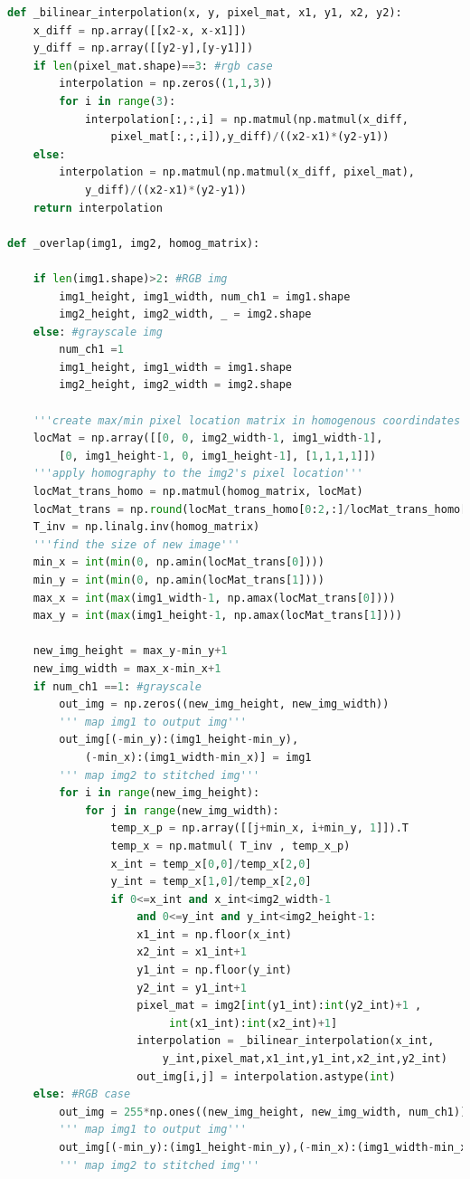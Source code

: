 \documentclass[12pt]{article}
\begin{document}
\vspace{3em}
\begin{lstlisting}[language=python]
def _bilinear_interpolation(x, y, pixel_mat, x1, y1, x2, y2):
	x_diff = np.array([[x2-x, x-x1]])
	y_diff = np.array([[y2-y],[y-y1]])
	if len(pixel_mat.shape)==3: #rgb case
		interpolation = np.zeros((1,1,3))
		for i in range(3):
			interpolation[:,:,i] = np.matmul(np.matmul(x_diff, 
				pixel_mat[:,:,i]),y_diff)/((x2-x1)*(y2-y1))
	else:
		interpolation = np.matmul(np.matmul(x_diff, pixel_mat),
			y_diff)/((x2-x1)*(y2-y1))
	return interpolation

def _overlap(img1, img2, homog_matrix):
	                  
	if len(img1.shape)>2: #RGB img
		img1_height, img1_width, num_ch1 = img1.shape
		img2_height, img2_width, _ = img2.shape
	else: #grayscale img
		num_ch1 =1
		img1_height, img1_width = img1.shape
		img2_height, img2_width = img2.shape
	
	'''create max/min pixel location matrix in homogenous coordindates'''
	locMat = np.array([[0, 0, img2_width-1, img1_width-1], 
		[0, img1_height-1, 0, img1_height-1], [1,1,1,1]])
	'''apply homography to the img2's pixel location'''
	locMat_trans_homo = np.matmul(homog_matrix, locMat)
	locMat_trans = np.round(locMat_trans_homo[0:2,:]/locMat_trans_homo[2,:])
	T_inv = np.linalg.inv(homog_matrix)
	'''find the size of new image'''
	min_x = int(min(0, np.amin(locMat_trans[0])))
	min_y = int(min(0, np.amin(locMat_trans[1])))
	max_x = int(max(img1_width-1, np.amax(locMat_trans[0])))
	max_y = int(max(img1_height-1, np.amax(locMat_trans[1])))
	
	new_img_height = max_y-min_y+1
	new_img_width = max_x-min_x+1
	if num_ch1 ==1: #grayscale
		out_img = np.zeros((new_img_height, new_img_width))
		''' map img1 to output img'''
		out_img[(-min_y):(img1_height-min_y),
			(-min_x):(img1_width-min_x)] = img1
		''' map img2 to stitched img'''
		for i in range(new_img_height):
			for j in range(new_img_width):
				temp_x_p = np.array([[j+min_x, i+min_y, 1]]).T
				temp_x = np.matmul( T_inv , temp_x_p)
				x_int = temp_x[0,0]/temp_x[2,0]
				y_int = temp_x[1,0]/temp_x[2,0]
				if 0<=x_int and x_int<img2_width-1 
					and 0<=y_int and y_int<img2_height-1:
					x1_int = np.floor(x_int)
					x2_int = x1_int+1
					y1_int = np.floor(y_int)
					y2_int = y1_int+1
					pixel_mat = img2[int(y1_int):int(y2_int)+1 ,
						 int(x1_int):int(x2_int)+1]
					interpolation = _bilinear_interpolation(x_int,
						y_int,pixel_mat,x1_int,y1_int,x2_int,y2_int)
					out_img[i,j] = interpolation.astype(int)
	else: #RGB case
		out_img = 255*np.ones((new_img_height, new_img_width, num_ch1))
		''' map img1 to output img'''
		out_img[(-min_y):(img1_height-min_y),(-min_x):(img1_width-min_x), :] = img1
		''' map img2 to stitched img'''
		

\end{lstlisting}
\end{document}
